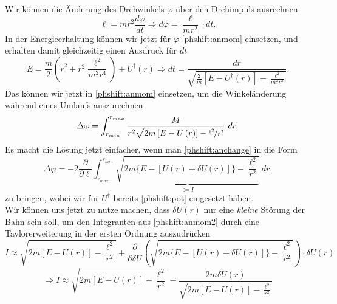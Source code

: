 \begin{Answer}[ref = phshift]
	Wir können die Änderung des Drehwinkels $\varphi$ über den Drehimpuls ausrechnen
	\begin{equation}\label{phshift:anmom}
		\ell = mr^2\frac{d\varphi}{dt} \Rightarrow d\varphi = \frac{\ell}{mr^2}\cdot dt.
	\end{equation}
	In der Energieerhaltung können wir jetzt für $\dot{\varphi}$ \eqref{phshift:anmom} einsetzen, und erhalten damit gleichzeitig einen Ausdruck für $dt$
	\begin{equation}\label{phshift:energy}
	E= \frac{m}{2}\left(\dot{r}^2 + r^2 \frac{\ell^2}{m^2r^4}\right) + U^{\dagger}\left(r\right) \Rightarrow dt = \frac{dr}{\sqrt{\frac{2}{m}\left[E-U^{\dagger}\left(r\right)\right] - \frac{\ell^2}{m^2r^2}}}.
	\end{equation}
	Das können wir jetzt in \eqref{phshift:anmom} einsetzen, um die Winkeländerung während eines Umlaufs auszurechnen
	\begin{equation}\label{phshift:anchange}
	\Delta \varphi = \int_{r_{min}}^{r_{max}} \frac{M}{r^2\sqrt{2m \left[E-U\left(r\right)\right] - \nicefrac{\ell^2}{r^2}}} ~dr.
	\end{equation}
	Es macht die Lösung jetzt einfacher, wenn man \eqref{phshift:anchange} in die Form
	\begin{equation}\label{phshift:anmom2}
		\Delta \varphi = -2\frac{\partial}{\partial \ell} \int_{r_{max}}^{r_{min}} \underbrace{\sqrt{2m\{E-\left[U\left(r\right) + \delta U\left(r\right)\right]\} - \frac{\ell^2}{r^2}}}_{:=I}~dr.
	\end{equation}
	zu bringen, wobei wir für $U^{\dagger}$ bereits \eqref{phshift:pot} eingesetzt haben.\\
	Wir können uns jetzt zu nutze machen, dass $\delta U\left(r\right)$ nur eine \textit{kleine} Störung der Bahn sein soll, um den Integranten aus \eqref{phshift:anmom2} durch eine Taylorerweiterung in der ersten Ordnung auszudrücken
	\begin{equation*}
		I \approx \sqrt{2m\left[E-U\left(r\right)\right] - \frac{\ell^2}{r^2}} + \frac{\partial}{\partial \delta U}\left(\sqrt{2m\{E-\left[U\left(r\right) + \delta U\left(r\right)\right]\} - \frac{\ell^2}{r^2}}\right) \cdot \delta U\left(r\right)
	\end{equation*}
	\begin{equation}\label{phshift:itay}
		\Rightarrow I \approx \sqrt{2m\left[E-U\left(r\right)\right] - \frac{\ell^2}{r^2}} - \frac{2m\delta U\left(r\right)}{\sqrt{2m\left[E-U\left(r\right) \right] - \frac{\ell^2}{r^2}}}

\end{equation}
\end{Answer}
